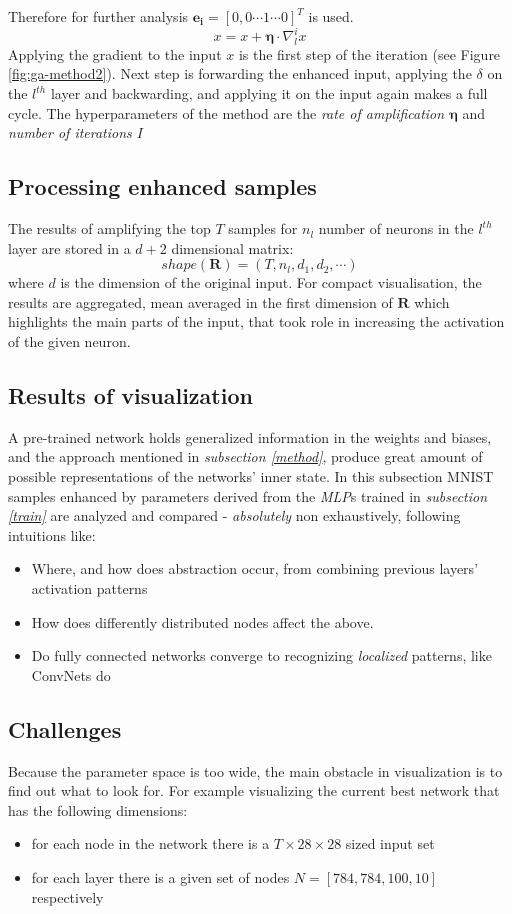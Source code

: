 Therefore for further analysis $\mathbf{e_i} = [0, 0 \cdots 1 \cdots 0]^T$ is used.
$$x = x + \mathbf{\eta}\cdot\nabla_l^i x$$
Applying the gradient to the input $x$ is the first step of the iteration (see Figure \ref{fig:ga-method2}). Next step is forwarding the enhanced input, applying the $\delta$ on the $l^{th}$ layer and backwarding, and applying it on the input again makes a full cycle.
The hyperparameters of the method are the \emph{rate of amplification $\mathbf{\eta}$} and \emph{number of iterations $I$}

\subsection{Processing enhanced samples}
The results of amplifying the top $T$ samples for $n_l$ number of neurons in the $l^{th}$ layer are stored in a $d + 2$ dimensional matrix:
$$
    shape(\mathbf{R}) = (T, n_l, d_1, d_2, \cdots)
$$
where $d$ is the dimension of the original input.
For compact visualisation, the results are aggregated, mean averaged in the first dimension of $\mathbf{R}$ which highlights the main parts of the input, that took role in increasing the activation of the given neuron.


\subsection{Results of visualization}

A pre-trained network holds generalized information in the weights and biases, and the approach mentioned in \emph{subsection \ref{method}}, produce great amount of possible representations of the networks' inner state. In this subsection MNIST samples enhanced by parameters derived from the \emph{MLP}s trained in \emph{subsection \ref{train}} are analyzed and compared - \textit{absolutely} non exhaustively, following intuitions like:

\begin{itemize}
    \item Where, and how does abstraction occur, from combining previous layers' activation patterns
    \item How does differently distributed nodes affect the above.
    \item Do fully connected networks converge to recognizing \emph{localized} patterns, like ConvNets do
\end{itemize}

\subsection{Challenges} Because the parameter space is too wide, the main obstacle in visualization is to find out what to look for. For example visualizing the current best network that has the following dimensions: 
\begin{itemize}
    \item for each node in the network there is a $T \times 28 \times 28$ sized input set
    \item for each layer there is a given set of nodes $N = [784, 784, 100, 10]$ respectively
\end{itemize}

